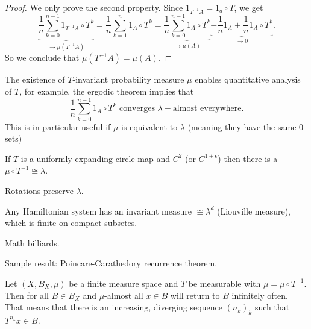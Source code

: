 \documentclass{article}
\newcommand*{\reci}[1]{{\frac{1}{#1}}}
\begin{document}
\begin{proof}
    We only prove the second property. Since $1_{T^{-1}A}=1_a\circ T$, we get
    $$\underbrace{\reci n\sum_{k=0}^{n-1}1_{T^{-1}A}\circ T^k}_{\to\mu(T^{-1}A)}=\reci n\sum_{k=1}^{n} 1_A\circ T^k= \underbrace{\reci n\sum_{k=0}^{n-1}1_A\circ T^k}_{\to \mu(A)} \underbrace{-\reci n1_A+\reci n1_A\circ T^k}_{\to0}.$$
    So we conclude that $\mu(T^{-1}A) = \mu(A)$.
\end{proof}

The existence of $T$-invariant probability measure $\mu$ enables quantitative analysis of $T$, for example, the ergodic theorem implies that
$$\reci n \sum_{k=0}^{n-1}1_A\circ T^k \text{ converges } \lambda-\text{almost everywhere}.$$
This is in particular useful if $\mu$ is equivalent to $\lambda$ (meaning they have the same $0$-sets)

\begin{exam}
    If $T$ is a uniformly expanding circle map and $C^2$ (or $C^{1+\epsilon}$) then there is a $\mu\circ T^{-1} \cong \lambda$.
\end{exam}

\begin{exam}
    Rotations preserve $\lambda$.
\end{exam}

\begin{exam}
    Any Hamiltonian system has an invariant measure $\cong \lambda^d$ (Liouville measure), which is finite on compact subsetes.
\end{exam}

\begin{exam}
    Math billiards.
\end{exam}

Sample result: Poincare-Carathedory recurrence theorem.

\begin{thm}
    Let $(X, B_X, \mu)$ be a finite measure space and $T$ be measurable with $\mu = \mu \circ T^{-1}$. Then for all $B \in B_X$ and $\mu$-almost all $x\in B$ will return to $B$ infinitely often. That means that there is an increasing, diverging sequence $(n_k)_k$ such that $T^{n_k}x \in B$.
\end{thm}
\end{document}
